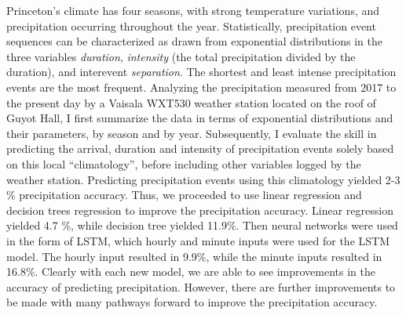 

Princeton's climate has four seasons, with strong temperature
variations, and precipitation occurring throughout the
year. Statistically, precipitation event sequences can be
characterized as drawn from exponential distributions in the three
variables \textit{duration}, \textit{intensity} (the total
precipitation divided by the duration), and interevent
\textit{separation}. The shortest and least intense precipitation
events are the most frequent. Analyzing the precipitation measured
from 2017 to the present day by a Vaisala WXT530 weather station
located on the roof of Guyot Hall, I first summarize the data in terms
of exponential distributions and their parameters, by season and by
year. Subsequently, I evaluate the skill in predicting the arrival,
duration and intensity of precipitation events solely based on this
local ``climatology'', before including other variables logged by the weather station. Predicting precipitation events using this climatology yielded 2-3 \% precipitation accuracy. Thus, we proceeded to use linear regression and decision trees regression to improve the precipitation accuracy. Linear regression yielded 4.7 \%, while decision tree yielded 11.9\%. Then neural networks were used in the form of LSTM, which hourly and minute inputs were used for the LSTM model. The hourly input resulted in 9.9\%, while the minute inputs resulted in 16.8\%. Clearly with each new model, we are able to see improvements in the accuracy of predicting precipitation. However, there are further improvements to be made with many pathways forward to improve the precipitation accuracy.  
